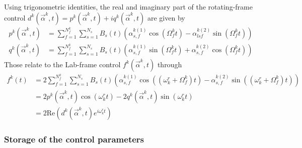 \documentclass[11pt]{article}
\begin{document}
Using trigonometric identities, the real and imaginary part of the rotating-frame control $d^k(\vec{\alpha}^k,t) = p^k(\vec{\alpha}^k,t) + iq^k(\vec{\alpha}^k,t)$ are given by
\begin{align}
  p^k(\vec{\alpha}^k,t) &= \sum_{f=1}^{N_f^k} \sum_{s=1}^{N_s} B_s(t)
  \left(\alpha^{k
  (1)}_{s,f} \cos(\Omega_f^k t) - \alpha^{k (2)}_{lsf} \sin(\Omega_f^k t)
  \right) \\
  q^k(\vec{\alpha}^k,t) &= \sum_{f=1}^{N_f^k} \sum_{s=1}^{N_s} B_s(t)\left( \alpha^{k
  (1)}_{s,f} \sin(\Omega_f^k t) + \alpha^{k (2)}_{s,f} \cos(\Omega_f^k t)
  \right)
\end{align}
Those relate to the Lab-frame control $f^k(\vec{\alpha}^k,t)$ through
\begin{align}
  f^k(t) &=  2\sum_{f=1}^{N_f^k} \sum_{s=1}^{N_s} B_s(t) \left(\alpha_{s,f}^{k(1)} \cos((\omega_k^{r} + \Omega_f^k) t) - \alpha_{s,f}^{k(2)}\sin((\omega_k^{r} + \Omega_f^k) t) \right) \\
         &= 2 p^k(\vec{\alpha}^k, t) \cos(\omega_k^{r} t) - 2 q^k(\vec{\alpha}^k,
         t)\sin(\omega_k^{r} t) \\
         &= 2\mbox{Re}\left( d^k(\vec{\alpha}^k,t)e^{i\omega_k^r t} \right)
\end{align}

\subsubsection{Storage of the control parameters}
\end{document}
